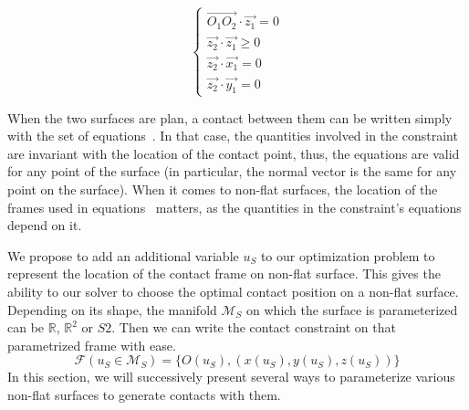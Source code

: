 \begin{equation}
  \left\{
  \begin{array}{ll}
    \overrightarrow{O_1O_2}\cdot\vec{z_1} = 0\\
    \vec{z_2}\cdot\vec{z_1} \geq 0 \\
    \vec{z_2}\cdot\vec{x_1} = 0 \\
    \vec{z_2}\cdot\vec{y_1} = 0
  \end{array}
  \right.
\label{eq:planar_contact}
\end{equation}

When the two surfaces are plan, a contact between them can be written simply with the set of equations~.
In that case, the quantities involved in the constraint are invariant with the location of the contact point, thus, the equations are valid for any point of the surface (in particular, the normal vector is the same for any point on the surface).
When it comes to non-flat surfaces, the location of the frames used in equations~ matters, as the quantities in the constraint's equations depend on it.



We propose to add an additional variable $u_S$ to our optimization problem to represent the location of the contact frame on non-flat surface.
This gives the ability to our solver to choose the optimal contact position on a non-flat surface.
Depending on its shape, the manifold $\mathcal{M}_S$ on which the surface is parameterized can be $\mathbb{R}$, $\mathbb{R}^2$ or $S2$.
Then we can write the contact constraint on that parametrized frame with ease.
\begin{equation}
\label{eq:param_frame}
  \mathcal{F}(u_S\in \mathcal{M}_S) = \{O(u_S), (x(u_S), y(u_S), z(u_S))\}
\end{equation}
In this section, we will successively present several ways to parameterize various non-flat surfaces to generate contacts with them.

